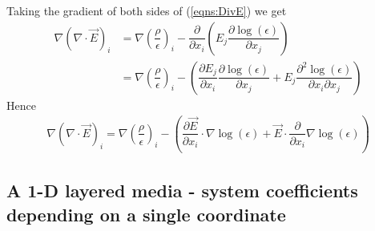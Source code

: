 \documentclass[12pt,twoside]{report}
\begin{document}
Taking the gradient of both sides of (\ref{eqns:DivE}) we get
\begin{align*}
\nabla \left( \nabla \cdot \overrightarrow{E} \right)_i &=\nabla\left( \dfrac{\rho}{\epsilon}\right)_i-\dfrac{\partial}{\partial x_i}\left( E_j \dfrac{\partial \log(\epsilon)}{\partial x_j}\right) \\&= \nabla\left( \dfrac{\rho}{\epsilon}\right)_i - \left( \dfrac{\partial E_j}{\partial x_i}\dfrac{\partial \log(\epsilon)}{\partial x_j} + E_j \dfrac{\partial^2 \log(\epsilon)}{\partial x_i \partial x_j}\right)
\end{align*}
Hence
\begin{align}
\label{eqns:E_Wave_extra_term_Grad_Div_E_expanded}
\nabla \left( \nabla \cdot \overrightarrow{E} \right)_i = \nabla\left( \dfrac{\rho}{\epsilon}\right)_i - \left(\dfrac{\partial \overrightarrow{E}}{\partial x_i} \cdot \nabla \log(\epsilon) + \overrightarrow{E} \cdot \dfrac{\partial}{\partial x_i} \nabla \log(\epsilon) \right)
\end{align}

\subsection{A 1-D layered media - system coefficients depending on a single coordinate}
\end{document}

